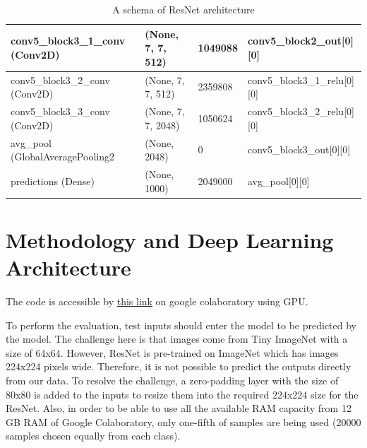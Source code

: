 \documentclass[12pt,oneside,geqno]{article}
\begin{document}
\begin{table}[]
{\begin{tabular}{llll}
				\multicolumn{1}{|l|}{conv5\_block3\_1\_conv (Conv2D)}  & \multicolumn{1}{l|}{(None, 7, 7, 512)}    & \multicolumn{1}{l|}{1049088} & \multicolumn{1}{l|}{conv5\_block2\_out{[}0{]}{[}0{]}}     \\ \hline
				\multicolumn{1}{|l|}{conv5\_block3\_2\_conv (Conv2D)}  & \multicolumn{1}{l|}{(None, 7, 7, 512)}    & \multicolumn{1}{l|}{2359808} & \multicolumn{1}{l|}{conv5\_block3\_1\_relu{[}0{]}{[}0{]}} \\ \hline
				\multicolumn{1}{|l|}{conv5\_block3\_3\_conv (Conv2D)}  & \multicolumn{1}{l|}{(None, 7, 7, 2048)}   & \multicolumn{1}{l|}{1050624} & \multicolumn{1}{l|}{conv5\_block3\_2\_relu{[}0{]}{[}0{]}} \\ \hline
				\multicolumn{1}{|l|}{avg\_pool (GlobalAveragePooling2} & \multicolumn{1}{l|}{(None, 2048)}         & \multicolumn{1}{l|}{0}       & \multicolumn{1}{l|}{conv5\_block3\_out{[}0{]}{[}0{]}}     \\ \hline
				predictions (Dense)                                    & (None, 1000)                              & 2049000                      & avg\_pool{[}0{]}{[}0{]}                                   \\ \hline
		\end{tabular}}
		\label{tab:ResNet}
		\caption{A schema of ResNet architecture}
	\end{table}
	
	
	
	\section{Methodology and Deep Learning Architecture}
	The code is accessible by \href{https://colab.research.google.com/drive/1LOb1nhmdRy_zXkRVinynlgsTIWOysq0U?usp=sharing}{this link} on google colaboratory using GPU.
	
	To perform the evaluation, test inputs should enter the model to be predicted by the model. The challenge here is that images come from Tiny ImageNet with a size of 64x64. However, ResNet is pre-trained on ImageNet which has images 224x224 pixels wide. Therefore, it is not possible to predict the outputs directly from our data. To resolve the challenge, a zero-padding layer with the size of 80x80 is added to the inputs to resize them into the required 224x224 size for the ResNet. Also, in order to be able to use all the available RAM capacity from 12 GB RAM of Google Colaboratory, only one-fifth of samples are being used (20000 samples chosen equally from each class). 
	
\end{document}
